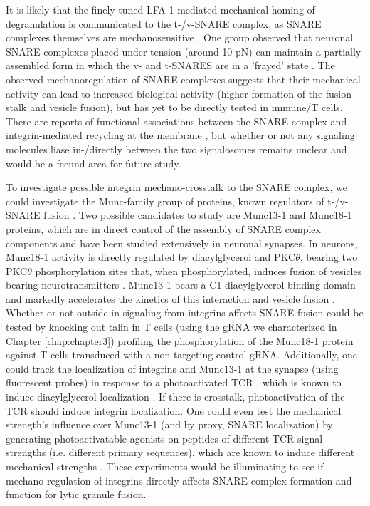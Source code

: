 It is likely that the finely tuned LFA-1 mediated mechanical homing of degranulation is communicated to the t-/v-SNARE complex, as SNARE complexes themselves are mechanosensitive \cite{Risselada2020}. One group observed that neuronal SNARE complexes placed under tension (around 10 pN) can maintain a partially-assembled form in which the v- and t-SNARES are in a 'frayed' state \cite{Zhou2017}. The observed mechanoregulation of SNARE complexes suggests that their mechanical activity can lead to increased biological activity (higher formation of the fusion stalk and vesicle fusion), but has yet to be directly tested in immune/T cells. There are reports of functional associations between the SNARE complex and integrin-mediated recycling at the membrane \cite{Riggs2012, Zhuang2020, Nagy2009}, but whether or not any signaling molecules liase in-/directly between the two signalosomes remains unclear and would be a fecund area for future study. 

To investigate possible integrin mechano-crosstalk to the SNARE complex, we could investigate the Munc-family group of proteins, known regulators of t-/v-SNARE fusion \cite{Ma2011, Yoon2018}. Two possible candidates to study are Munc13-1 and Munc18-1 proteins, which are in direct control of the assembly of SNARE complex components \cite{Diao2010} and have been studied extensively in neuronal synapses. In neurons, Munc18-1 activity is directly regulated by diacylglycerol and PKC$\theta$, bearing two PKC$\theta$ phosphorylation sites that, when phosphorylated, induces fusion of vesicles bearing neurotransmitters \cite{Genc2014, Nagy2009, Korogod2007}. Munc13-1 bears a C1 diacylglycerol binding domain \cite{Song1999} and markedly accelerates the kinetics of this interaction and vesicle fusion \cite{Ma2011, Song1999}. Whether or not outside-in signaling from integrins affects SNARE fusion could be tested by knocking out talin in T cells (using the gRNA we characterized in Chapter \ref{chap:chapter3}) profiling the phosphorylation of the Munc18-1 protein against T cells transduced with a non-targeting control gRNA. Additionally, one could track the localization of integrins and Munc13-1 at the synapse (using fluorescent probes) in response to a photoactivated TCR \cite{Huse2007}, which is known to induce diacylglycerol localization \cite{Quann2009}. If there is crosstalk, photoactivation of the TCR should induce integrin localization. One could even test the mechanical strength's influence over Munc13-1 (and by proxy, SNARE localization) by generating photoactivatable agonists on peptides of different TCR signal strengths (i.e. different primary sequences), which are known to induce different mechanical strengths \cite{VanderMerwe2001, Ma2010, Ma2012, Lanzavecchia1999}. These experiments would be illuminating to see if mechano-regulation of integrins directly affects SNARE complex formation and function for lytic granule fusion.

